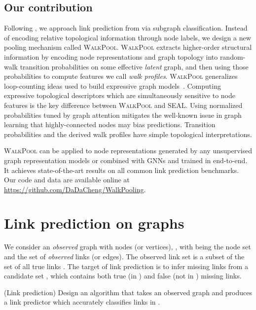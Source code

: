 \documentclass[11pt]{article}
\newcommand{\walkpool}{\textsc{WalkPool}\xspace}
\newcommand{\UPDATE}[1]{\textcolor{WowColor}{{#1}}}
\renewcommand{\UPDATE}[1]{#1}
\begin{document}
\subsection{Our contribution}
\vspace{-2mm}
Following \citet{zhang2018link}, we approach link prediction from via subgraph classification. Instead of encoding relative topological information through node labels, we design a new pooling mechanism called \walkpool. \walkpool extracts higher-order structural information by encoding node representations and graph topology into random-walk transition probabilities on some effective \emph{latent} graph, and then using those probabilities to compute features we call \emph{walk profiles}. \walkpool generalizes loop-counting ideas used to build expressive graph models~\citep{pan2016predicting}. \UPDATE{Computing expressive topological descriptors which are simultaneously sensitive to node features is the key difference between \walkpool and SEAL.} Using normalized probabilities tuned by graph attention mitigates the well-known issue in graph learning that highly-connected nodes may bias predictions.  Transition probabilities and the derived walk profiles have simple topological interpretations. 

\walkpool can be applied to node representations generated by any unsupervised graph representation models or combined with GNNs and trained in end-to-end. It achieves state-of-the-art results on all common link prediction benchmarks. Our code and data are available online at \url{https://github.com/DaDaCheng/WalkPooling}.

\vspace{-2mm}
\section{Link prediction on graphs}
\vspace{-2mm}
We consider an \emph{observed} graph with  nodes (or vertices), , with  being the node set and  the set of \emph{observed} links (or edges). The observed link set  is a subset  of the set of all true links . The target of link prediction is to infer missing links from a candidate set , which contains both true (in ) and false (not in ) missing links.

\begin{problem}(Link prediction)
\label{prob:lp}
Design an algorithm  that takes an observed graph  and produces a link predictor  which accurately classifies links in .
\end{problem}
\end{document}
